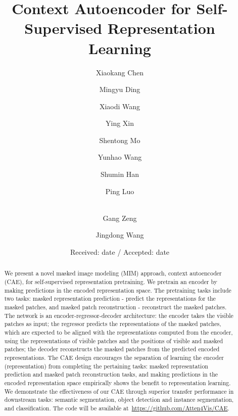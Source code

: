 \documentclass[twocolumn]{svjour3}          \smartqed  \usepackage{graphicx}
\begin{document}
\title{Context Autoencoder for Self-Supervised Representation Learning}


\author{Xiaokang Chen \and Mingyu Ding \and Xiaodi Wang \and Ying Xin \and Shentong Mo \and Yunhao Wang \and Shumin Han \and Ping Luo \and \\ Gang Zeng \and Jingdong Wang}




\date{Received: date / Accepted: date}



\maketitle

\begin{abstract}
We present a novel masked image modeling
(MIM) approach,
context autoencoder (CAE),
for self-supervised representation pretraining.
We pretrain an encoder
by making predictions
in the encoded representation space.
The pretraining tasks include
two tasks: masked representation prediction - predict the representations
for the masked patches,
and masked patch reconstruction - reconstruct the masked patches.
The network is an encoder-regressor-decoder architecture:
the encoder takes the visible patches as input;
the regressor predicts the representations of the masked patches,
which are expected to be aligned
with the representations
computed from the encoder,
using the representations of visible patches and the positions of visible and masked patches;
the decoder reconstructs the masked patches
from the predicted encoded representations.
The CAE design encourages 
the separation of learning the encoder (representation) 
from completing the pertaining tasks: masked representation prediction and masked patch reconstruction tasks,
and making predictions in the encoded representation space
empirically shows
the benefit
to representation learning.
We demonstrate the effectiveness of our CAE
through 
superior transfer 
performance in downstream tasks:
semantic segmentation, object detection and instance segmentation, and classification.
The code will be available at~\url{https://github.com/Atten4Vis/CAE}.
\end{abstract}
\end{document}
